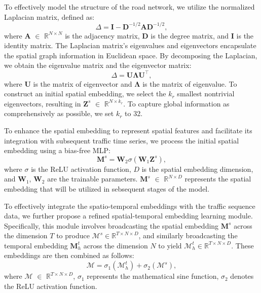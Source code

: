 To effectively model the structure of the road network, we utilize the normalized Laplacian matrix, defined as:
\begin{equation}
    \Delta = \mathbf{I} - \mathbf{D}^{-1/2} \mathbf{A} \mathbf{D}^{-1/2},
\end{equation}
where $\mathbf{A}$ $\in$ $\mathbb{R}^{N\times N}$ is the adjacency matrix, $\mathbf{D}$ is the degree matrix, and $\mathbf{I}$ is the identity matrix. The Laplacian matrix's eigenvalues and eigenvectors encapsulate the spatial graph information in Euclidean space. By decomposing the Laplacian, we obtain the eigenvalue matrix and the eigenvector matrix:
\begin{equation}
    \Delta = \mathbf{U}\mathbf{\Lambda}\mathbf{U}^{\top},
\end{equation}
where $\mathbf{U}$ is the matrix of eigenvector  and $\mathbf{\Lambda}$ is the matrix of eigenvalue. To construct an initial spatial embedding, we select the $\textit{k}_{r}$ smallest nontrivial eigenvectors, resulting in $\mathbf{Z}^{s}$ $\in$ $\mathbb{R}^{N\times \textit{k}_{r}}$.
To capture global information as comprehensively as possible, we set $\textit{k}_{r}$ to 32.

To enhance the spatial embedding to represent spatial features and facilitate its integration with subsequent traffic time series, we process the initial spatial embedding using a bias-free MLP:
\begin{equation}
    \mathbf{M}^{s} = \mathbf{W}_{2}\sigma(\mathbf{W}_{1}\mathbf{Z}^{s}),
\end{equation}
where $\sigma$ is the ReLU activation function, $\textit{D}$ is the spatial embedding dimension, and $\mathbf{W}_1$, $\mathbf{W}_2$ are the trainable parameters. $\mathbf{M}^{s}$ $\in$ $\mathbb{R}^{N\times D}$ represents the spatial embedding that will be utilized in sebsequent stages of the model.

To effectively integrate the spatio-temporal embeddings with the traffic sequence data, we further propose a refined spatial-temporal embedding learning module. Specifically, this module involves broadcasting the spatial embedding $\mathbf{M}^{s}$ across the dimension $T$ to produce $\bm{\mathcal{M}}^{s} \in \mathbb{R}^{T\times N\times D}$, and similarly broadcasting the temporal embedding  $\mathbf{M}^{t}_{h}$ across the dimension $N$  to yield $\bm{\mathcal{M}}^{t}_{h} \in \mathbb{R}^{T\times N\times D}$. These embeddings are then combined as follows:
\begin{equation}
    \bm{\mathcal{M}} = \sigma_{1}(\bm{\mathcal{M}}^{t}_{h}) + \sigma_{2}(\bm{\mathcal{M}}^{s}),
    \label{eq:embeddings}
\end{equation}
where $\bm{\mathcal{M}}$ $\in$ $\mathbb{R}^{T\times N\times D}$, $\sigma_{1}$ represents the mathematical sine function, $\sigma_{2}$ denotes the ReLU activation function. 

